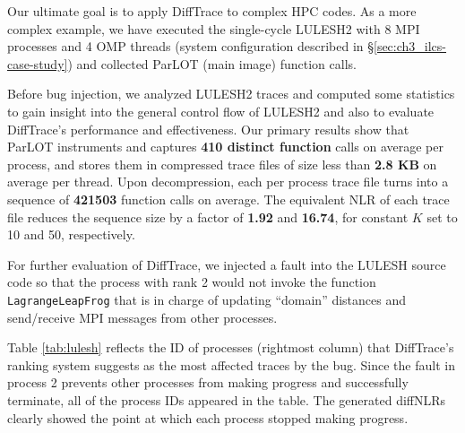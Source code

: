 

Our ultimate goal is to apply DiffTrace to complex HPC codes.
%
As a more complex example, we have executed the single-cycle LULESH2\cite{LULESH2:changes} with 8 MPI processes
and 4 OMP threads (system configuration described in \S\ref{sec:ch3_ilcs-case-study})
and collected ParLOT (main image) function calls.


Before bug injection, we analyzed LULESH2 traces and computed some statistics to gain insight into the
general control flow of LULESH2 and also to evaluate DiffTrace's
performance and effectiveness.
%
Our primary results show that ParLOT instruments and captures \textbf{410 distinct function} calls on
average per process, and stores them in compressed trace files of size less than \textbf{2.8 KB}
on average per thread.
%
Upon decompression, each per process trace file
turns into a sequence of \textbf{421503} function calls on average. The equivalent NLR of each trace file reduces the sequence size by a factor of \textbf{1.92} and \textbf{16.74}, for constant $K$ set to 10 and 50, respectively.
%
%
%
%
%


For further evaluation of DiffTrace, we injected a fault into the LULESH source code so that the process with rank 2
would not invoke the function \texttt{LagrangeLeapFrog} that is in charge of updating ``domain'' distances and send/receive
MPI messages from other processes.
%

%
Table \ref{tab:lulesh} reflects the ID of processes (rightmost column)
that DiffTrace's ranking system suggests as the most affected traces by the bug.
%
Since the fault in process 2 prevents other processes from making progress and successfully terminate,
all of the process IDs appeared in the table.
The generated diffNLRs clearly showed the point at which each process stopped making progress.

